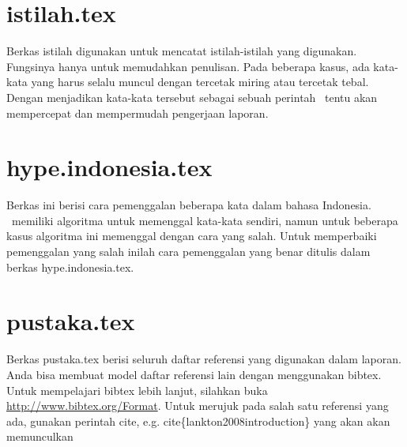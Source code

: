     \section{istilah.tex}
    Berkas istilah digunakan untuk mencatat istilah-istilah yang digunakan.
    Fungsinya hanya untuk memudahkan penulisan.
    Pada beberapa kasus, ada kata-kata yang harus selalu muncul dengan tercetak
    miring atau tercetak tebal.
    Dengan menjadikan kata-kata tersebut sebagai sebuah perintah \latex~tentu akan
    mempercepat dan mempermudah pengerjaan laporan.


    \section{hype.indonesia.tex}
    Berkas ini berisi cara pemenggalan beberapa kata dalam bahasa Indonesia.
    \latex~memiliki algoritma untuk memenggal kata-kata sendiri, namun untuk
    beberapa kasus algoritma ini memenggal dengan cara yang salah.
    Untuk memperbaiki pemenggalan yang salah inilah cara pemenggalan yang benar
    ditulis dalam berkas hype.indonesia.tex.


    \section{pustaka.tex}
    Berkas pustaka.tex berisi seluruh daftar referensi yang digunakan dalam
    laporan.
    Anda bisa membuat model daftar referensi lain dengan menggunakan bibtex.
    Untuk mempelajari bibtex lebih lanjut, silahkan buka
    \url{http://www.bibtex.org/Format}.
    Untuk merujuk pada salah satu referensi yang ada, gunakan perintah \bslash
    cite, e.g. \bslash cite\{lankton2008introduction\} yang akan akan memunculkan
    \cite{lankton2008introduction}


